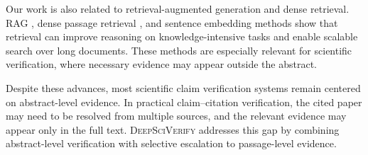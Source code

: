 \documentclass{article}
\theoremstyle{plain}
\theoremstyle{definition}
\theoremstyle{remark}
\begin{document}
Our work is also related to retrieval-augmented generation and dense retrieval. RAG \cite{lewis2020rag}, dense passage retrieval \cite{karpukhin2020dense}, and sentence embedding methods \cite{reimers2019sentence} show that retrieval can improve reasoning on knowledge-intensive tasks and enable scalable search over long documents. These methods are especially relevant for scientific verification, where necessary evidence may appear outside the abstract.

Despite these advances, most scientific claim verification systems remain centered on abstract-level evidence. In practical claim--citation verification, the cited paper may need to be resolved from multiple sources, and the relevant evidence may appear only in the full text. \textsc{DeepSciVerify} addresses this gap by combining abstract-level verification with selective escalation to passage-level evidence.




\end{document}
